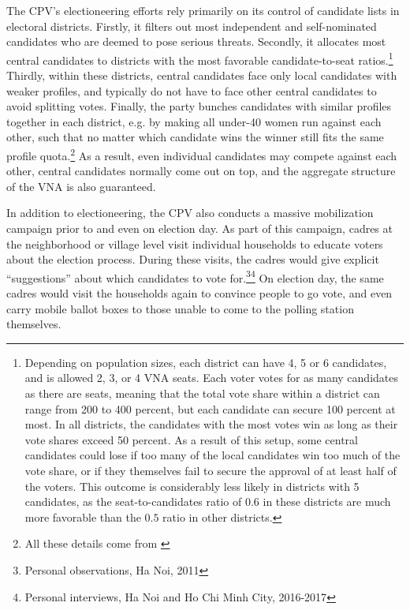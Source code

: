 \documentclass[12pt]{article}
\newcommand{\1}{\mathbbm{1}}
\begin{document}
The CPV's electioneering efforts rely primarily on its control of candidate lists in electoral districts. Firstly, it filters out most independent and self-nominated candidates who are deemed to pose serious threats. Secondly, it allocates most central candidates to districts with the most favorable candidate-to-seat ratios.\footnote{Depending on population sizes, each district can have 4, 5 or 6 candidates, and is allowed 2, 3, or 4 VNA seats. Each voter votes for as many candidates as there are seats, meaning that the total vote share within a district can range from 200 to 400 percent, but each candidate can secure 100 percent at most. In all districts, the candidates with the most votes win as long as their vote shares exceed 50 percent. As a result of this setup, some central candidates could lose if too many of the local candidates win too much of the vote share, or if they themselves fail to secure the approval of at least half of the voters. This outcome is considerably less likely in districts with 5 candidates, as the seat-to-candidates ratio of $0.6$ in these districts are much more favorable than the $0.5$ ratio in other districts.} Thirdly, within these districts, central candidates face only local candidates with weaker profiles, and typically do not have to face other central candidates to avoid splitting votes. Finally, the party bunches candidates with similar profiles together in each district, e.g. by making all under-40 women run against each other, such that no matter which candidate wins the winner still fits the same profile quota.\footnote{All these details come from \citep{MaleskySchuler2011}} As a result, even individual candidates may compete against each other, central candidates normally come out on top, and the aggregate structure of the VNA is also guaranteed. 

In addition to electioneering, the CPV also conducts a massive mobilization campaign prior to and even on election day. As part of this campaign, cadres at the neighborhood or village level visit individual households to educate voters about the election process. During these visits, the cadres would give explicit ``suggestions'' about which candidates to vote for.\footnote{Personal observations, Ha Noi, 2011}\footnote{Personal interviews, Ha Noi and Ho Chi Minh City, 2016-2017} On election day, the same cadres would visit the households again to convince people to go vote, and even carry mobile ballot boxes to those unable to come to the polling station themselves.
\end{document}
